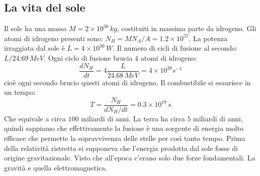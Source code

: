 \subsection{La vita del sole}
Il sole ha una massa $M=2\times10^{30}\,kg$, costituiti in massima parte da idrogeno. Gli atomi di idrogeno presenti sono: $N_H=MN_A/A=1.2\times10^{57}$. La potenza irraggiata dal sole è $L=4\times10^{36}\,W$. Il numero di cicli di fusione al secondo: $L/24.69\,MeV$. Ogni ciclo di fusione brucia $4$ atomi di idrogeno:
\begin{equation*}
    \frac{dN_H}{dt}=4\frac{L}{24.68\,MeV}=4\times10^{38}s^{-1}
\end{equation*}
cioè ogni secondo brucio questi atomi di idrogeno. Il combustibile si esaurisce in un tempo:
\begin{equation*}
    T=\frac{N_H}{dN_H/dt}=0.3\times10^{19}\,s
\end{equation*}
Che equivale a circa $100$ miliardi di anni. La terra ha circa $5$ miliardi di anni, quindi sappiamo che effettivamente la fusione è una sorgente di energia molto efficace che permette la sopravvivenza delle stelle per così tanto tempo. Prima della relatività ristretta si supponeva che l'energia prodotta dal sole fosse di origine gravitazionale. Visto che all'epoca c'erano solo due forze fondamentali. La gravità e quella elettromagnetica.
